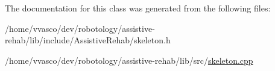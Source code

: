 The documentation for this class was generated from the following files\+:\begin{DoxyCompactItemize}
\item 
/home/vvasco/dev/robotology/assistive-\/rehab/lib/include/\+Assistive\+Rehab/skeleton.\+h\item 
/home/vvasco/dev/robotology/assistive-\/rehab/lib/src/\hyperlink{skeleton_8cpp}{skeleton.\+cpp}\end{DoxyCompactItemize}
